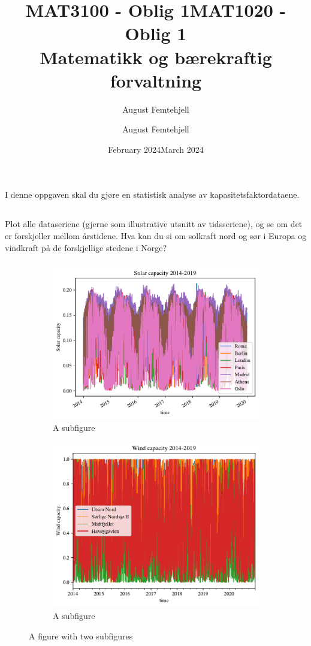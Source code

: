 \documentclass{article}
\title{MAT3100 - Oblig 1}
\author{August Femtehjell}
\date{February 2024}
\title{MAT1020 - Oblig 1\\Matematikk og bærekraftig forvaltning}
\author{August Femtehjell}
\date{March 2024}
\begin{document}
\maketitle

\section{}
I denne oppgaven skal du gjøre en statistisk analyse av kapasitetsfaktordataene.

\subsection{}
Plot alle dataseriene (gjerne som illustrative utsnitt av tidsseriene), og se om det er forskjeller mellom årstidene. Hva kan du si om solkraft nord og sør i Europa og vindkraft på de forskjellige stedene i Norge?

\subsubsection{}

\begin{figure}
\centering
\begin{subfigure}{.5\textwidth}
  \centering
  \includegraphics[width=.5\linewidth]{oblig/figures/Solar/Solar capacity 2014-2019.pdf}
  \caption{A subfigure}
  \label{fig:sub1}
\end{subfigure}%
\begin{subfigure}{.5\textwidth}
  \centering
  \includegraphics[width=.5\linewidth]{oblig/figures/Wind/Wind capacity 2014-2019.pdf}
  \caption{A subfigure}
  \label{fig:sub2}
\end{subfigure}
\caption{A figure with two subfigures}
\label{fig:test}
\end{figure}
\end{document}
